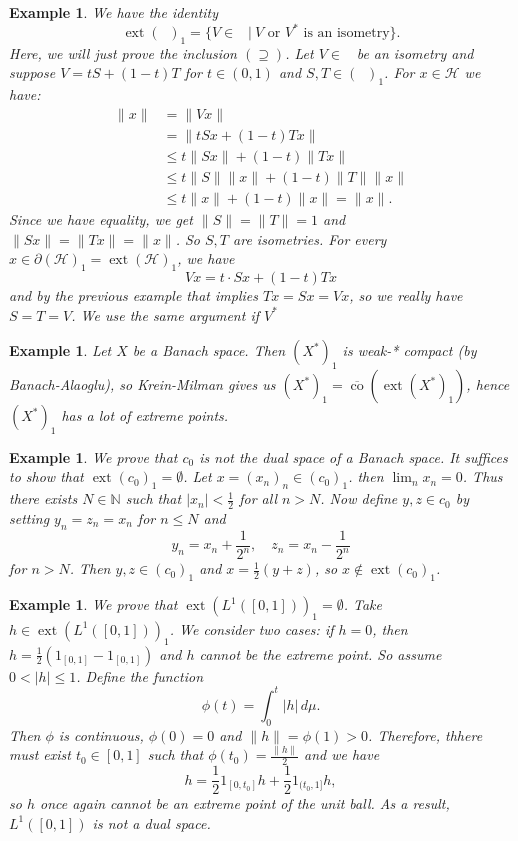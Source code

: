 \documentclass[10pt, a4paper]{article}
\newtheorem{example}[thm]{Example}
\newcommand{\N}{\mathbb {N}}
\DeclareMathOperator{\ext}{ext}
\DeclareMathOperator{\co}{co}
\DeclareMathOperator{\bh}{\mathcal{B} (\mathcal{H})}
\begin{document}
\begin{example}
  We have the identity 
  $$\ext (\bh)_1 = \{V \in \bh\ |\ \textrm{$V$ or $V^*$ is an isometry}\}.$$
  Here, we will just prove the inclusion $(\supseteq)$.
  Let $V \in \bh$  be an isometry and suppose $V = tS + (1 - t)T$
  for $t \in (0, 1)$ and $S, T \in (\bh)_1$.
  For $x \in \mathcal{H}$ we have:
  \begin{align*}
    \| x\| &= \| V x\|\\
    &= \| tSx + (1 - t)Tx\|\\
    &\leq t \|Sx\| + (1 - t) \|Tx\|\\
    &\leq t \| S\| \|x\| + (1 - t) \|T\| \|x\|\\
    &\leq t \|x\| + (1 - t)\|x\| = \|x\|. 
  \end{align*}
  Since we have equality, we get $\|S\| = \|T\| = 1$
  and $\|Sx\| = \|Tx\| = \|x\|$. So $S, T$ are isometries.
  For every $x \in \partial (\mathcal{H})_1 = \ext (\mathcal{H})_1$, we have 
  $$Vx = t \cdot Sx + (1 - t) Tx$$ and by the previous example that implies $Tx = Sx = Vx$,
  so we really have $S = T = V$. We use the same argument if $V^*$
\end{example}

\begin{example}
  Let $X$ be a Banach space. Then $(X^*)_1$ is weak-* compact (by Banach-Alaoglu),
  so Krein-Milman gives us $(X^*)_1 = \overline{\co} (\ext (X^*)_1)$, hence $(X^*)_1$ has a lot of extreme points.
\end{example}

\begin{example}
  We prove that $c_0$ is not the dual space of a Banach space.
  It suffices to show that $\ext (c_0)_1 = \emptyset$. Let $x = (x_n)_n \in (c_0)_1$.
  then $\lim_n x_n = 0$. Thus there exists $N \in \N$ such that $|x_n| < \frac{1}{2}$ for all $n > N$.
  Now define $y, z \in c_0$ by setting $y_n = z_n = x_n$ for $n \leq N$
  and $$y_n = x_n + \frac{1}{2^n},\quad z_n = x_n - \frac{1}{2^n}$$ 
  for $n > N$. Then $y, z \in (c_0)_1$ and $x = \frac{1}{2} (y + z)$, so $x \notin \ext (c_0)_1$.
\end{example}

\begin{example}
  We prove that $ \ext (L^1 ([0, 1]))_1 = \emptyset$. Take $h \in \ext(L^1 ([0, 1]))_1$. 
  We consider two cases: if $h = 0$, then $h = \frac{1}{2} (1_{[0, 1]} - 1_{[0, 1]})$ and $h$ cannot be the extreme point.
  So assume $0 < |h| \leq 1$. Define the function 
  $$\phi (t) = \int_0 ^t |h|\, d\mu.$$
  Then $\phi$ is continuous, $\phi(0) = 0$ and $\| h\| = \phi(1) > 0$.
  Therefore, thhere must exist $t_0 \in [0, 1]$ such that $\phi(t_0) =\frac{ \|h\|}{2}$
  and we have $$h = \frac{1}{2} 1_{[0, t_0]} h + \frac{1}{2} 1_{(t_0, 1]} h,$$
  so $h$ once again cannot be an extreme point of the unit ball.  
  As a result, $L^1 ([0, 1])$ is not a dual space.
\end{example}
\end{document}

